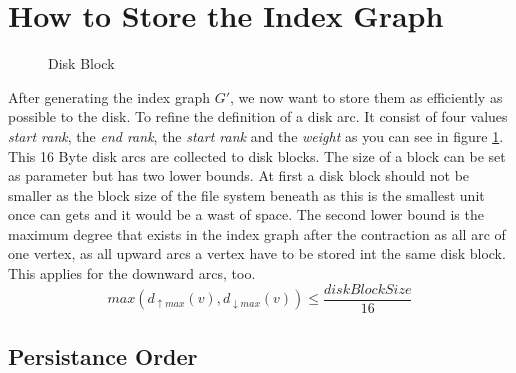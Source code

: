 \section{How to Store the Index Graph}\label{sec:how_to_store}

\begin{figure}
    \centering
    
\caption{Disk Block}
    \label{fig:disk_block}
\end{figure}

After generating the index graph $G'$, we now want to store them as efficiently as possible to the disk. To refine the definition of a disk arc. It consist of four values \textit{start rank}, the \textit{end rank}, the \textit{start rank} and the \textit{weight} as you can see in figure \ref{fig:disk_block}.
\\
This 16 Byte disk arcs are collected to disk blocks. The size of a block can be set as parameter but has two lower bounds. At first a disk block should not be smaller as the block size of the file system beneath as this is the smallest unit once can gets and it would be a wast of space.
The second lower bound is the maximum degree that exists in the index graph after the contraction as all arc of one vertex, as all upward arcs a vertex have to be stored int the same disk block. This applies for the downward arcs, too. 
\begin{equation*}
    max(d_{\uparrow max}(v), d_{\downarrow max}(v)) \leqslant  \frac{diskBlockSize}{16}  
\end{equation*}

\subsection{Persistance Order}\label{sec:persistanceOrder}




